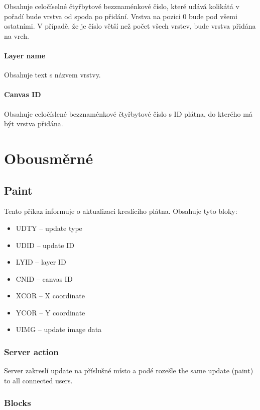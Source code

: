 \documentclass[12pt,oneside,a4paper]{report}
\begin{document}
Obsahuje celočíselné čtyřbytové bezznaménkové číslo, které udává kolikátá v pořadí bude vrstva od spoda po přidání. Vrstva na pozici $0$ bude pod všemi ostatními. V případě, že je číslo větší než počet všech vrstev, bude vrstva přidána na vrch.

\paragraph{Layer name}

Obsahuje text s názvem vrstvy.

\paragraph{Canvas ID}

Obsahuje celočíslené bezznaménkové čtyřbytové číslo s ID plátna, do kterého má být vrstva přidána.

\section{Obousměrné}

\subsection{Paint}

Tento příkaz informuje o aktualizaci kreslícího plátna. Obsahuje tyto bloky:

\begin{itemize}
	\item UDTY -- update type
	\item UDID -- update ID
	\item LYID -- layer ID
	\item CNID -- canvas ID
	\item XCOR -- X coordinate
	\item YCOR -- Y coordinate
	\item UIMG -- update image data				
\end{itemize}

\subsubsection{Server action}

Server zakreslí update na příslušné místo a podé rozešle the same update (paint) to all connected users.

\subsubsection{Blocks}
\end{document}
